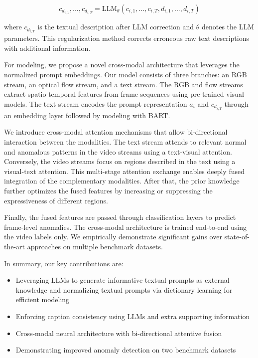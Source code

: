 \begin{equation}
 c_{d_{i, 1}}, ..., c_{d_{i, T}} = \text{LLM}_\theta(c_{i,1}, ..., c_{i,T}, d_{i,1}, ..., d_{i,T})
\end{equation}

where $c_{d_{i, T}}$ is the textual description after LLM correction and $\theta$ denotes the LLM parameters. This regularization method corrects erroneous raw text descriptions with additional information.

For modeling, we propose a novel cross-modal architecture that leverages the normalized prompt embeddings. Our model consists of three branches: an RGB stream, an optical flow stream\citep{a-fortun2015optical}, and a text stream. The RGB and flow streams extract spatio-temporal features from frame sequences using pre-trained visual models\citep{a-carreira2017quo}. The text stream encodes the prompt representation $a_i$ and $c_{d_{i, T}}$ through an embedding layer followed by modeling with BART\citep{a-lewis2019bart}. 

We introduce cross-modal attention mechanisms that allow bi-directional interaction between the modalities. The text stream attends to relevant normal and anomalous patterns in the video streams using a text-visual attention. Conversely, the video streams focus on regions described in the text using a visual-text attention. This multi-stage attention exchange enables deeply fused integration of the complementary modalities. After that, the prior knowledge further optimizes the fused features by increasing or suppressing the expressiveness of different regions.

Finally, the fused features are passed through classification layers to predict frame-level anomalies. The cross-modal architecture is trained end-to-end using the video labels only. We empirically demonstrate significant gains over state-of-the-art approaches on multiple benchmark datasets. 

In summary, our key contributions are:

\begin{itemize}
    \item Leveraging LLMs to generate informative textual prompts as external knowledge and normalizing textual prompts via dictionary learning for efficient modeling
    \item Enforcing caption consistency using LLMs and extra supporting information
    \item Cross-modal neural architecture with bi-directional attentive fusion
    \item Demonstrating improved anomaly detection on two benchmark datasets
\end{itemize}

